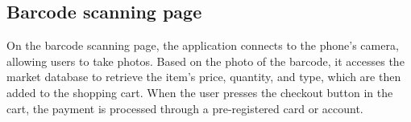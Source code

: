 \documentclass[conference]{IEEEtran}
\begin{document}
\subsection{Barcode scanning page }
On the barcode scanning page, the application connects to the phone’s camera, allowing users to take photos. Based on the photo of the barcode, it accesses the market database to retrieve the item's price, quantity, and type, which are then added to the shopping cart. When the user presses the checkout button in the cart, the payment is processed through a pre-registered card or account. 
\end{document}
